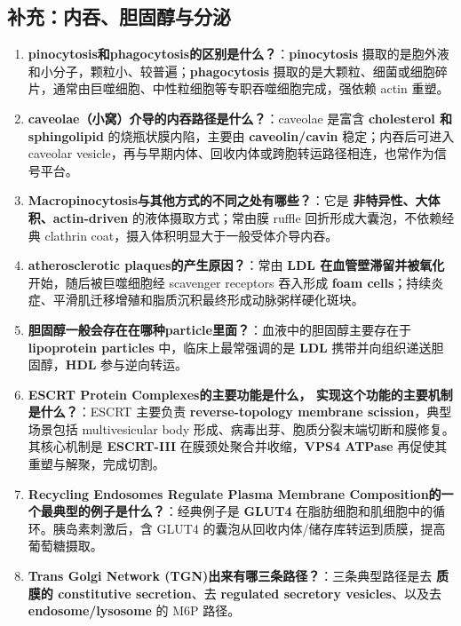 \documentclass[12pt,fontset=none]{ctexart}
\begin{document}
\subsection*{补充：内吞、胆固醇与分泌}
\begin{enumerate}
\item \textbf{pinocytosis和phagocytosis的区别是什么？}：\textbf{pinocytosis} 摄取的是胞外液和小分子，颗粒小、较普遍；\textbf{phagocytosis} 摄取的是大颗粒、细菌或细胞碎片，通常由巨噬细胞、中性粒细胞等专职吞噬细胞完成，强依赖 actin 重塑。

\item \textbf{caveolae（小窝）介导的内吞路径是什么？}：caveolae 是富含 \textbf{cholesterol 和 sphingolipid} 的烧瓶状膜内陷，主要由 \textbf{caveolin/cavin} 稳定；内吞后可进入 caveolar vesicle，再与早期内体、回收内体或跨胞转运路径相连，也常作为信号平台。

\item \textbf{Macropinocytosis与其他方式的不同之处有哪些？}：它是 \textbf{非特异性、大体积、actin-driven} 的液体摄取方式；常由膜 ruffle 回折形成大囊泡，不依赖经典 clathrin coat，摄入体积明显大于一般受体介导内吞。

\item \textbf{atherosclerotic plaques的产生原因？}：常由 \textbf{LDL 在血管壁滞留并被氧化} 开始，随后被巨噬细胞经 scavenger receptors 吞入形成 \textbf{foam cells}；持续炎症、平滑肌迁移增殖和脂质沉积最终形成动脉粥样硬化斑块。

\item \textbf{胆固醇一般会存在在哪种particle里面？}：血液中的胆固醇主要存在于 \textbf{lipoprotein particles} 中，临床上最常强调的是 \textbf{LDL} 携带并向组织递送胆固醇，\textbf{HDL} 参与逆向转运。

\item \textbf{ESCRT Protein Complexes的主要功能是什么， 实现这个功能的主要机制是什么？}：ESCRT 主要负责 \textbf{reverse-topology membrane scission}，典型场景包括 multivesicular body 形成、病毒出芽、胞质分裂末端切断和膜修复。其核心机制是 \textbf{ESCRT-III} 在膜颈处聚合并收缩，\textbf{VPS4 ATPase} 再促使其重塑与解聚，完成切割。

\item \textbf{Recycling Endosomes Regulate Plasma Membrane Composition的一个最典型的例子是什么？}：经典例子是 \textbf{GLUT4} 在脂肪细胞和肌细胞中的循环。胰岛素刺激后，含 GLUT4 的囊泡从回收内体/储存库转运到质膜，提高葡萄糖摄取。

\item \textbf{Trans Golgi Network (TGN)出来有哪三条路径？}：三条典型路径是去 \textbf{质膜的 constitutive secretion}、去 \textbf{regulated secretory vesicles}、以及去 \textbf{endosome/lysosome} 的 M6P 路径。


\end{enumerate}
\end{document}
